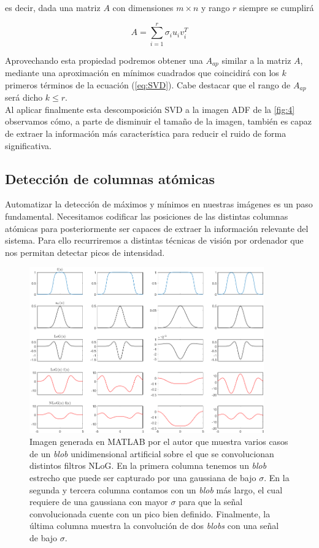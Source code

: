 es decir, dada una matriz $A$ con dimensiones $m \times n$ y rango $r$ siempre se cumplirá

\begin{equation} \label{eq:SVD}
    A = \sum^r_{i=1} \sigma_i u_i v_i^T 
\end{equation}

Aprovechando esta propiedad podremos obtener una $A_{ap}$ similar a la matriz $A$, mediante una aproximación en mínimos cuadrados que coincidirá con los $k$ primeros términos de la ecuación (\ref{eq:SVD}). Cabe destacar que el rango de $A_{ap}$ será dicho $k \leq r$. \\

Al aplicar finalmente esta descomposición SVD a la imagen ADF de la  \autoref{fig:4} observamos cómo, a parte de disminuir el tamaño de la imagen, también es capaz de extraer la información más característica para reducir el ruido de forma significativa.

\subsection{Detección de columnas atómicas}

Automatizar la detección de máximos y mínimos en nuestras imágenes es un paso fundamental. Necesitamos codificar las posiciones de las distintas columnas atómicas para posteriormente ser capaces de extraer la información relevante del sistema. Para ello recurriremos a distintas técnicas de visión por ordenador que nos permitan detectar picos de intensidad. 

\begin{figure}[h!]
    \centering
    \includegraphics[width=0.9\textwidth]{fig/Fig5.png}
    \caption{Imagen generada en MATLAB por el autor \cite{repo} que muestra varios casos de un \textit{blob} unidimensional artificial sobre el que se convolucionan distintos filtros NLoG. En la primera columna tenemos un \textit{blob} estrecho que puede ser capturado por una gaussiana de bajo $\sigma$. En la segunda y tercera columna contamos con un \textit{blob} más largo, el cual requiere de una gaussiana con mayor $\sigma$ para que la señal convolucionada cuente con un pico bien definido. Finalmente, la última columna muestra la convolución de dos \textit{blobs} con una señal de bajo $\sigma$.}
    \label{fig:5}
\end{figure}

